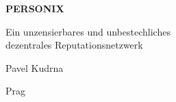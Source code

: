 \thispagestyle{empty}
\begin{center}
  {\sffamily\bfseries\fontsize{34}{40}\selectfont PERSONIX\par}
  \vspace{2.2em}
  {\rmfamily\large Ein unzensierbares und unbestechliches\\[0.25em]
   dezentrales Reputationsnetzwerk\par}
\end{center}
\begin{center}
  {\rmfamily\Large Pavel Kudrna\par}
  \vspace{0.45em}
  {\rmfamily\small Prag\quad\textbullet{}\par}
\end{center}
\clearpage
